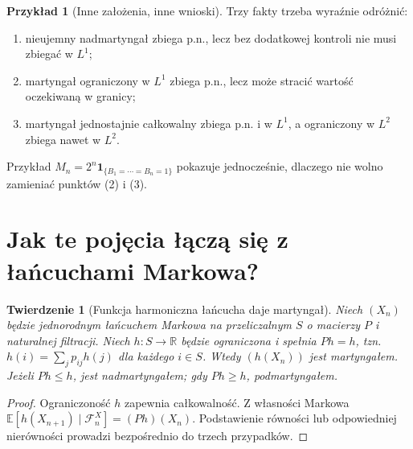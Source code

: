 \documentclass[11pt,a4paper,oneside]{report}
\numberwithin{equation}{chapter}
\theoremstyle{plain}
\newtheorem{twierdzenie}{Twierdzenie}[chapter]
\theoremstyle{definition}
\newtheorem{przyklad}{Przykład}[chapter]
\theoremstyle{remark}
\newcommand{\R}{\mathbb{R}}
\newcommand{\E}{\mathbb{E}}
\newcommand{\ind}[1]{\mathbf{1}_{#1}}
\begin{document}
\begin{przyklad}[Inne założenia, inne wnioski]
Trzy fakty trzeba wyraźnie odróżnić:
\begin{enumerate}
\item nieujemny nadmartyngał zbiega p.n.,
  lecz bez dodatkowej kontroli nie musi zbiegać w $L^1$;
\item martyngał ograniczony w $L^1$ zbiega p.n.,
  lecz może stracić wartość oczekiwaną w granicy;
\item martyngał jednostajnie całkowalny zbiega
  p.n. i w $L^1$, a ograniczony w $L^2$
  zbiega nawet w $L^2$.
\end{enumerate}
Przykład $M_n=2^n\ind{\{B_1=\cdots=B_n=1\}}$
pokazuje jednocześnie, dlaczego nie wolno
zamieniać punktów (2) i (3).
\end{przyklad}

\section{Jak te pojęcia łączą się z łańcuchami Markowa?}

\begin{twierdzenie}[Funkcja harmoniczna łańcucha daje martyngał]
Niech $(X_n)$ będzie jednorodnym łańcuchem Markowa
na przeliczalnym $S$ o macierzy $P$ i naturalnej
filtracji. Niech $h:S\to\R$ będzie ograniczona
i spełnia $Ph=h$, tzn.
$h(i)=\sum_jp_{ij}h(j)$ dla każdego $i\in S$.
Wtedy $(h(X_n))$ jest martyngałem.
Jeżeli $Ph\leq h$, jest nadmartyngałem;
gdy $Ph\geq h$, podmartyngałem.
\end{twierdzenie}
\begin{proof}
Ograniczoność $h$ zapewnia całkowalność.
Z własności Markowa
$\E[h(X_{n+1})\mid\mathcal F_n^X]
=(Ph)(X_n)$.
Podstawienie równości lub odpowiedniej nierówności
prowadzi bezpośrednio do trzech przypadków.
\end{proof}
\end{document}
